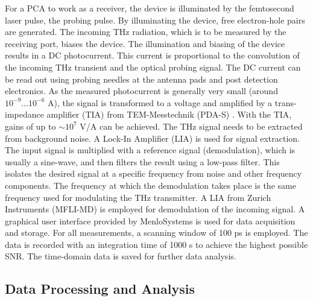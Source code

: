 For a PCA to work as a receiver, the device is illuminated by the femtosecond laser pulse, the probing pulse. By illuminating the device, free electron-hole pairs are generated. The incoming THz radiation, which is to be measured by the receiving port, biases the device. The illumination and biasing of the device results in a DC photocurrent. This current is proportional to the convolution of the incoming THz transient and the optical probing signal. The DC current can be read out using probing needles at the antenna pads and post detection electronics. As the measured photocurrent is generally very small (around $10^{-9} ... 10^{-6}$ \si{\ampere}), the signal is transformed to a voltage and amplified by a trans-impedance amplifier (TIA) from TEM-Messtechnik (PDA-S) \cite{PDASPhotodiodenVerstaerker}. With the TIA, gains of up to $\sim 10^7 $ \si{\volt}/\si{\ampere} can be achieved. The THz signal needs to be extracted from background noise. A Lock-In Amplifier (LIA) is used for signal extraction. The input signal is multiplied with a reference signal (demodulation), which is usually a sine-wave, and then filters the result using a low-pass filter. This isolates the desired signal at a specific frequency from noise and other frequency components. The frequency at which the demodulation takes place is the same frequency used for modulating the THz transmitter. A LIA from Zurich Instruments (MFLI-MD) \cite{MFLI500KHz2019} is employed for demodulation of the incoming signal. A graphical user interface provided by MenloSystems is used for data acquisition and storage. For all measurements, a scanning window of \num{100} \si{\pico \s} is employed. The data is recorded with an integration time of \num{1000} \si{\s} to achieve the highest possible SNR. The time-domain data is saved for further data analysis.


\subsection{Data Processing and Analysis}

